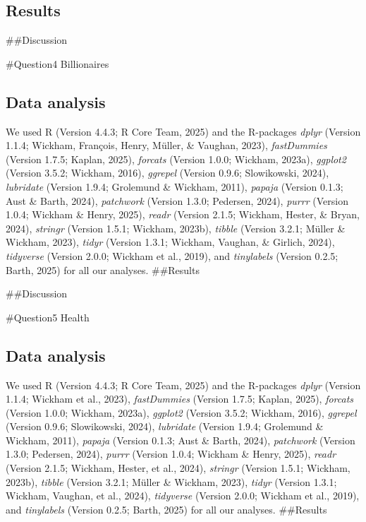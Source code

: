 \documentclass[
  man,floatsintext]{apa6}
\begin{document}
\subsection{Results}\label{results}

\#\#Discussion

\#Question4 Billionaires

\subsection{Data analysis}\label{data-analysis-1}

We used R (Version 4.4.3; R Core Team, 2025) and the R-packages \emph{dplyr} (Version 1.1.4; Wickham, François, Henry, Müller, \& Vaughan, 2023), \emph{fastDummies} (Version 1.7.5; Kaplan, 2025), \emph{forcats} (Version 1.0.0; Wickham, 2023a), \emph{ggplot2} (Version 3.5.2; Wickham, 2016), \emph{ggrepel} (Version 0.9.6; Slowikowski, 2024), \emph{lubridate} (Version 1.9.4; Grolemund \& Wickham, 2011), \emph{papaja} (Version 0.1.3; Aust \& Barth, 2024), \emph{patchwork} (Version 1.3.0; Pedersen, 2024), \emph{purrr} (Version 1.0.4; Wickham \& Henry, 2025), \emph{readr} (Version 2.1.5; Wickham, Hester, \& Bryan, 2024), \emph{stringr} (Version 1.5.1; Wickham, 2023b), \emph{tibble} (Version 3.2.1; Müller \& Wickham, 2023), \emph{tidyr} (Version 1.3.1; Wickham, Vaughan, \& Girlich, 2024), \emph{tidyverse} (Version 2.0.0; Wickham et al., 2019), and \emph{tinylabels} (Version 0.2.5; Barth, 2025) for all our analyses.
\#\#Results

\#\#Discussion

\#Question5 Health

\subsection{Data analysis}\label{data-analysis-2}

We used R (Version 4.4.3; R Core Team, 2025) and the R-packages \emph{dplyr} (Version 1.1.4; Wickham et al., 2023), \emph{fastDummies} (Version 1.7.5; Kaplan, 2025), \emph{forcats} (Version 1.0.0; Wickham, 2023a), \emph{ggplot2} (Version 3.5.2; Wickham, 2016), \emph{ggrepel} (Version 0.9.6; Slowikowski, 2024), \emph{lubridate} (Version 1.9.4; Grolemund \& Wickham, 2011), \emph{papaja} (Version 0.1.3; Aust \& Barth, 2024), \emph{patchwork} (Version 1.3.0; Pedersen, 2024), \emph{purrr} (Version 1.0.4; Wickham \& Henry, 2025), \emph{readr} (Version 2.1.5; Wickham, Hester, et al., 2024), \emph{stringr} (Version 1.5.1; Wickham, 2023b), \emph{tibble} (Version 3.2.1; Müller \& Wickham, 2023), \emph{tidyr} (Version 1.3.1; Wickham, Vaughan, et al., 2024), \emph{tidyverse} (Version 2.0.0; Wickham et al., 2019), and \emph{tinylabels} (Version 0.2.5; Barth, 2025) for all our analyses.
\#\#Results
\end{document}

